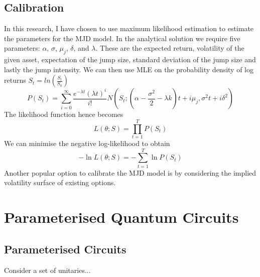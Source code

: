 \documentclass[12pt]{article}
\numberwithin{equation}{section}
\begin{document}
\subsection{Calibration}
In this research, I have chosen to use maximum likelihood estimation to estimate 
the parameters for the MJD model. In the analytical solution we require five 
parameters: $\alpha$, $\sigma$, $\mu_j$, $\delta$, and $\lambda$. These are the 
expected return, volatility of the given asset, expectation of the jump size, 
standard deviation of the jump size and lastly the jump intensity. We can then 
use MLE on the probability density of log returns $S_t = ln(\frac{S_t}{S_0})$ 
\begin{equation}
P(S_t) = \sum^\infty_{i=0} \frac{e^{-\lambda t}(\lambda t)^i}{i!}N(S_t;(\alpha - 
\frac{\sigma^2}{2}-\lambda k)t+i\mu_j,\sigma^2t+i\delta^2)
\end{equation}
The likelihood function hence becomes 
\begin{equation}
  L(\theta;S) = \prod^T_{t=1}P(S_t)
\end{equation}
We can minimise the negative log-likelihood to obtain 
\begin{equation}
  -\ln L(\theta;S) = -\sum^T_{t=1}\ln P(S_t)
\end{equation}
Another popular option to calibrate the MJD model is by considering the implied 
volatility surface of existing options.







\clearpage

\section{Parameterised Quantum Circuits}

\subsection{Parameterised Circuits}
Consider a set of unitaries... 
\end{document}
